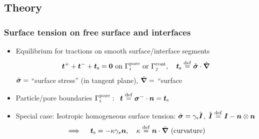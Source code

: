 \documentclass[11pt]{beamer} %
\newcommand{\surf}{\mathrm{s}}
\newcommand{\roughcite}[1]{\textsc{#1}}
\begin{document}
\subsection{Theory}
\begin{frame}
 \frametitle{Surface tension on free surface and interfaces}
 \vspace{-1em}
 \begin{center}
  \scalebox{0.75}{}
  \hspace{0.5em}
  \scalebox{0.75}{}
 \end{center}
\vspace{-1em}
\begin{itemize}
 \item Equilibrium for tractions on smooth surface/interface segments
\vspace{-0.7em}
\begin{align*}
 \ta t^+ + \ta t^- + \ta t_\surf = \ta 0 \text{ on } \Gamma_i^{\mathrm{pore}} \text{ or } \Gamma_j^{\mathrm{cont}},\quad \ta t_\surf \defeq \hat{\ts\sigma}\cdot\hat{\ta\nabla}
\end{align*}
$\hat{\boldsymbol{\sigma}} =$ ``surface stress'' (in tangent plane), $\hat{\boldsymbol{\nabla}} =$ ``surface 
 \item Particle/pore boundaries $\Gamma_i^{\mathrm{pore}}:\;\;\ta t\defeq \ts\sigma^-\cdot\ta n = \ta t_\surf$
\item Special case: Isotropic homogeneous surface tension: $\hat{\ts\sigma}=\gamma_\surf \hat{\ta I}$, $\hat{\boldsymbol{I}}\overset{\mathrm{def}}{=}\boldsymbol{I}-\boldsymbol{n}\mathbin{\otimes}\boldsymbol{n}$ \vspace{-0.5em}
\begin{align*}
 \implies\quad \ta t_\surf = - \kappa \gamma_s \ta n,\quad \kappa \defeq \ta n \cdot \hat{\ta\nabla} \text{ (curvature)}
\end{align*}
\end{itemize}
\end{frame}

%  
\end{document}
